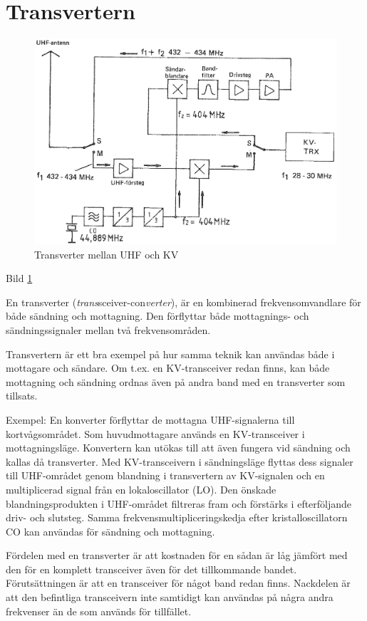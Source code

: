 \section{Transvertern}

\begin{figure}
  \includegraphics[width=\textwidth]{images/cropped_pdfs/bild_2_4-19.pdf}
  \caption{Transverter mellan UHF och KV}
  \label{fig:bildII4-19}
\end{figure}

Bild \ref{fig:bildII4-19}

En transverter (\emph{trans}sceiver-con\emph{verter}), är en
kombinerad frekvensomvandlare för både sändning och mottagning. Den
förflyttar både mottagnings- och sändningssignaler mellan två
frekvensområden.

Transvertern är ett bra exempel på hur samma teknik kan användas både
i mottagare och sändare. Om t.ex. en KV-transceiver redan finns, kan
både mottagning och sändning ordnas även på andra band med en
transverter som tillsats.

Exempel: En konverter förflyttar de mottagna UHF-signalerna till
kortvågsområdet. Som huvudmottagare används en KV-transceiver i
mottagningsläge. Konvertern kan utökas till att även fungera vid
sändning och kallas då transverter. Med KV-transceivern i
sändningsläge flyttas dess signaler till UHF-området genom blandning
i transvertern av KV-signalen och en multiplicerad signal från en
lokaloscillator (LO). Den önskade blandningsprodukten i
UHF-området filtreras fram och förstärks i efterföljande driv- och
slutsteg. Samma frekvensmultipliceringskedja efter kristalloscillatorn
CO kan användas för sändning och mottagning.

Fördelen med en transverter är att kostnaden för en sådan är låg
jämfört med den för en komplett transceiver även för det tillkommande
bandet. Förutsättningen är att en transceiver för något band redan
finns.  Nackdelen är att den befintliga transceivern inte samtidigt
kan användas på några andra frekvenser än de som används för
tillfället.
